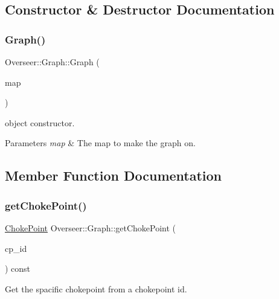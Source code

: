 \subsection{Constructor \& Destructor Documentation}
\mbox{\label{classOverseer_1_1Graph_af9efde8054cddf829f36a66ff8df5e8b}} 
\subsubsection{\texorpdfstring{Graph()}{Graph()}}
{\footnotesize\ttfamily Overseer\+::\+Graph\+::\+Graph (\begin{DoxyParamCaption}\item[{\hyperlink{classOverseer_1_1Map}{Map} $\ast$}]{map }\end{DoxyParamCaption})}



object constructor. 


\begin{DoxyParams}{Parameters}
{\em map} & The map to make the graph on. \\
\hline
\end{DoxyParams}


\subsection{Member Function Documentation}
\mbox{\label{classOverseer_1_1Graph_a5d31f9158cc08a492c88976aabe83622}} 
\subsubsection{\texorpdfstring{get\+Choke\+Point()}{getChokePoint()}}
{\footnotesize\ttfamily \hyperlink{classOverseer_1_1ChokePoint}{Choke\+Point} Overseer\+::\+Graph\+::get\+Choke\+Point (\begin{DoxyParamCaption}\item[{Choke\+Point\+Id}]{cp\+\_\+id }\end{DoxyParamCaption}) const}



Get the spacific chokepoint from a chokepoint id. 


